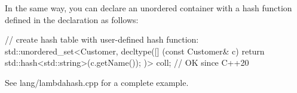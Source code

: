 In the same way, you can declare an unordered container with a hash function defined in the declaration as follows:

\begin{cpp}
// create hash table with user-defined hash function:
std::unordered_set<Customer,
					decltype([] (const Customer& c) {
						return std::hash<std::string>{}(c.getName());
					})> coll; // OK since C++20
\end{cpp}

See lang/lambdahash.cpp for a complete example.






